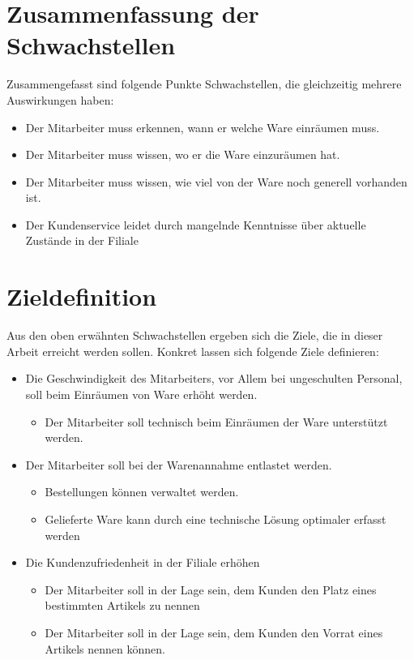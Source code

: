 \section{Zusammenfassung der Schwachstellen}
Zusammengefasst sind folgende Punkte Schwachstellen, die gleichzeitig mehrere Auswirkungen haben:
\begin{itemize}
	\item Der Mitarbeiter muss erkennen, wann er welche Ware einräumen muss.
	\item Der Mitarbeiter muss wissen, wo er die Ware einzuräumen hat.
	\item Der Mitarbeiter muss wissen, wie viel von der Ware noch generell vorhanden ist.
	\item Der Kundenservice leidet durch mangelnde Kenntnisse über aktuelle Zustände in der Filiale
\end{itemize}
\section{Zieldefinition}
\label{zieldefinition}
Aus den oben erwähnten Schwachstellen ergeben sich die Ziele, die in dieser Arbeit erreicht werden sollen. Konkret lassen sich folgende Ziele definieren:
\begin{itemize}
	\item Die Geschwindigkeit des Mitarbeiters, vor Allem bei ungeschulten Personal, soll beim Einräumen von Ware erhöht werden.
	\begin{itemize}
		\item Der Mitarbeiter soll technisch beim Einräumen der Ware unterstützt werden.
	\end{itemize}
	\item Der Mitarbeiter soll bei der Warenannahme entlastet werden.
	\begin{itemize}
		\item Bestellungen können verwaltet werden.
		\item Gelieferte Ware kann durch eine technische Lösung optimaler erfasst werden
	\end{itemize}
	\item Die Kundenzufriedenheit in der Filiale erhöhen
	\begin{itemize}
		\item Der Mitarbeiter soll in der Lage sein, dem Kunden den Platz eines bestimmten Artikels zu nennen
		\item Der Mitarbeiter soll in der Lage sein, dem Kunden den Vorrat eines Artikels nennen können. 
	\end{itemize}
\end{itemize}
